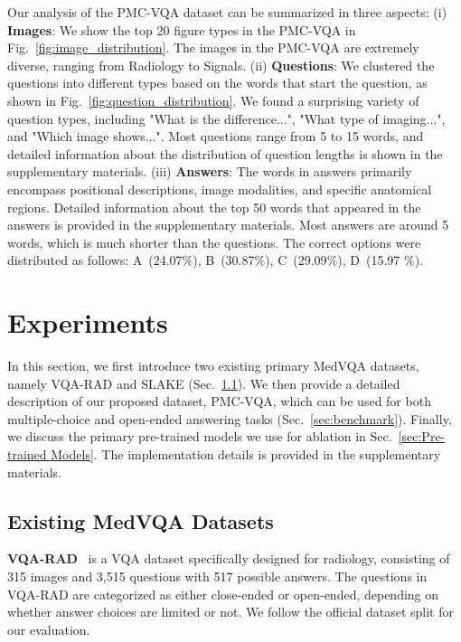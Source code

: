 \documentclass{article}
\begin{document}
Our analysis of the PMC-VQA dataset can be summarized in three aspects: 
(i) \textbf{Images}: We show the top 20 figure types in the PMC-VQA in Fig.~\ref{fig:image_distribution}. The images in the PMC-VQA are extremely diverse, ranging from Radiology to Signals. 
(ii) \textbf{Questions}: We clustered the questions into different types based on the words that start the question, as shown in Fig.~\ref{fig:question_distribution}. We found a surprising variety of question types, including "What is the difference...", "What type of imaging...", and "Which image shows...". Most questions range from 5 to 15 words, and detailed information about the distribution of question lengths is shown in the supplementary materials. (iii) \textbf{Answers}: The words in answers primarily encompass positional descriptions, image modalities, and specific anatomical regions. Detailed information about the top 50 words that appeared in the answers is provided in the supplementary materials. Most answers are around 5 words, which is much shorter than the questions. 
The correct options were distributed as follows: A~(24.07$\%$), B~(30.87$\%$), C~(29.09$\%$), D~(15.97 $\%$).


%
 
\section{Experiments}

In this section, we first introduce two existing primary MedVQA datasets, namely VQA-RAD and SLAKE (Sec.~\ref{sec:downstream}). We then provide a detailed description of our proposed dataset, PMC-VQA, which can be used for both multiple-choice and open-ended answering tasks (Sec.~\ref{sec:benchmark}). Finally, we discuss the primary pre-trained models we use for ablation in Sec.~\ref{sec:Pre-trained Models}. The implementation details is provided in the supplementary materials.

\subsection{Existing MedVQA Datasets}
\label{sec:downstream}

\noindent \textbf{VQA-RAD}~\cite{lau2018dataset} is a VQA dataset specifically designed for radiology, consisting of 315 images and 3,515 questions with 517 possible answers. The questions in VQA-RAD are categorized as either close-ended or open-ended, depending on whether answer choices are limited or not. We follow the official dataset split for our evaluation.
\end{document}
